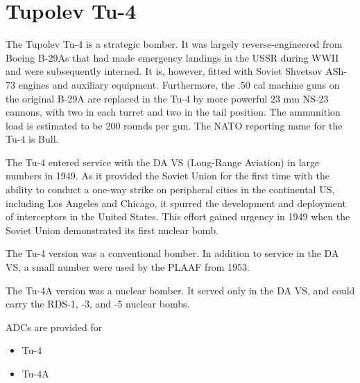 \section*{Tupolev Tu-4}

The Tupolev Tu-4 is a strategic bomber. It was largely reverse-engineered from Boeing B-29As that had made emergency landings in the USSR during WWII and were subsequently interned. It is, however, fitted with Soviet Shvetsov ASh-73 engines and auxiliary equipment. Furthermore, the .50 cal machine guns on the original B-29A are replaced in the Tu-4 by more powerful 23 mm NS-23 cannons, with two in each turret and two in the tail position. The ammunition load is estimated to be 200 rounds per gun. The NATO reporting name for the Tu-4 is Bull.

The Tu-4 entered service with the DA VS (Long-Range Aviation) in large numbers in 1949. As it provided the Soviet Union for the first time with the ability to conduct a one-way strike on peripheral cities in the continental US, including Los Angeles and Chicago, it spurred the development and deployment of interceptors in the United States. This effort gained urgency in 1949 when the Soviet Union demonstrated its first nuclear bomb.

The Tu-4 version was a conventional bomber. In addition to service in the DA VS, a small number were used by the PLAAF from 1953.

The Tu-4A version was a nuclear bomber. It served only in the DA VS, and could carry the RDS-1, -3, and -5 nuclear bombs.

ADCs are provided for
\begin{itemize}
    \item Tu-4
    \item Tu-4A
\end{itemize}